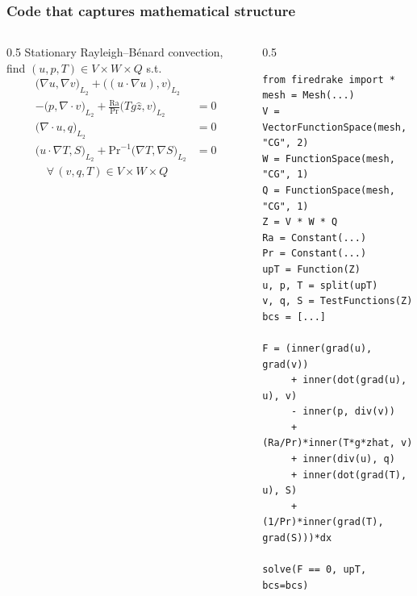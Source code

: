 \documentclass[presentation,aspectratio=43, 10pt]{beamer}
\begin{document}
\begin{frame}[fragile]
  \frametitle{Code that captures mathematical structure}
  \begin{columns}
    \begin{column}{0.5\framewidth}
      Stationary Rayleigh--B\'enard convection, find $(u, p, T) \in V\times W\times Q$ s.t.
        \begin{align*}
          {\big(\nabla u, \nabla v\big)}_{L_2} + {\big((u \cdot \nabla u), v\big)}_{L_2} \\
          - {\big(p, \nabla\cdot v\big)}_{L_2} + \frac{\text{Ra}}{\text{Pr}}
          {\big(Tg\hat{z}, v\big)}_{L_2} &= 0 \\
          {\big(\nabla\cdot u, q\big)}_{L_2} &= 0\\
          {\big(u \cdot \nabla T, S\big)}_{L_2}
          + \text{Pr}^{-1} {\big(\nabla T, \nabla S\big)}_{L_2} &= 0\\
          \quad \forall\, (v,q,T) \in V\times W \times Q
        \end{align*}
    \end{column}
      \begin{column}{0.5\framewidth}
\begin{verbatim}
from firedrake import *
mesh = Mesh(...)
V = VectorFunctionSpace(mesh, "CG", 2)
W = FunctionSpace(mesh, "CG", 1)
Q = FunctionSpace(mesh, "CG", 1)
Z = V * W * Q
Ra = Constant(...)
Pr = Constant(...)
upT = Function(Z)
u, p, T = split(upT)
v, q, S = TestFunctions(Z)
bcs = [...]

F = (inner(grad(u), grad(v))
     + inner(dot(grad(u), u), v)
     - inner(p, div(v))
     + (Ra/Pr)*inner(T*g*zhat, v)
     + inner(div(u), q)
     + inner(dot(grad(T), u), S)
     + (1/Pr)*inner(grad(T), grad(S)))*dx

solve(F == 0, upT, bcs=bcs)
\end{verbatim}
      \end{column}
  \end{columns}
\end{frame}
\end{document}
